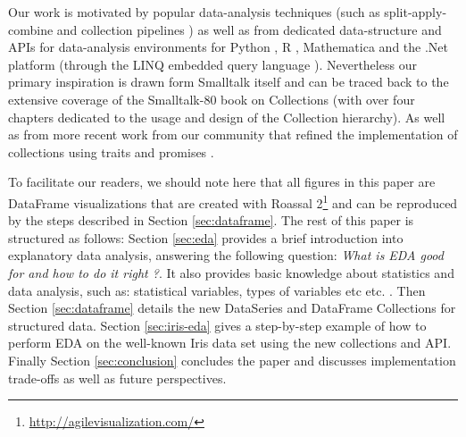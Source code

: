 \documentclass[sigplan]{acmart}
\makeatletter
\newcommand*{\etc}{%
    \@ifnextchar{.}%
        {etc}%
        {etc.\@\xspace}%
}
\makeatother
\begin{document}
Our work is motivated by popular data-analysis techniques (such as split-apply-combine \cite{wickham2011split} and collection pipelines \cite{Fowler15}) as well as from dedicated data-structure and APIs for data-analysis environments for Python \cite{McKinney}, R \cite{team2000r}, Mathematica \cite{wolfram1999mathematica} and the .Net platform (through the LINQ embedded query language \cite{meijer2006linq}). Nevertheless our primary inspiration is drawn form Smalltalk itself and can be traced back to the extensive coverage of the Smalltalk-80 book on Collections \cite{Goldberg} (with over four chapters dedicated to the usage and design of the Collection hierarchy). As well as from more recent work from our community that refined the implementation of collections using traits \cite{black2003applying, bourgois2010bloc, scharli2003traits} and promises \cite{Alcocer16}.

To facilitate our readers, we should note here that all figures in this paper are DataFrame visualizations that are created with Roassal 2\footnote{\url{http://agilevisualization.com/}} and can be reproduced by the steps described in Section \ref{sec:dataframe}.
The rest of this paper is structured as follows: Section \ref{sec:eda} provides a brief introduction into explanatory data analysis, answering the following question: \textit{What is EDA good for and how to do it right ?}.
It also provides basic knowledge about statistics and data analysis, such as: statistical variables, types of variables \etc. Then Section \ref{sec:dataframe} details the new DataSeries and DataFrame Collections for structured data. Section \ref{sec:iris-eda} gives a step-by-step example of how to perform EDA on the well-known Iris data set using the new collections and API.
Finally Section \ref{sec:conclusion} concludes the paper and discusses implementation trade-offs as well as future perspectives.



%
%
%
%
\end{document}
